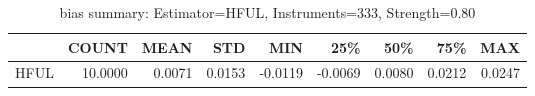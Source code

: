 \begin{table}[ht]
\centering
\caption{bias summary: Estimator=HFUL, Instruments=333, Strength=0.80}
\begin{tabular}{lrrrrrrrr}
\toprule
 & COUNT & MEAN & STD & MIN & 25\% & 50\% & 75\% & MAX \\
\midrule
HFUL & 10.0000 & 0.0071 & 0.0153 & -0.0119 & -0.0069 & 0.0080 & 0.0212 & 0.0247 \\
\bottomrule
\end{tabular}
\end{table}
